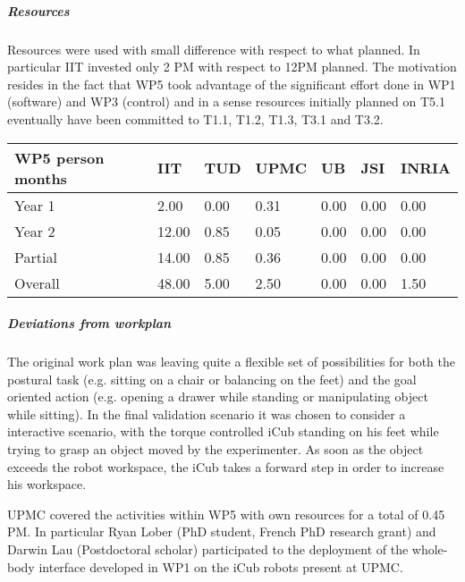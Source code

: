
\subparagraph{Resources}

Resources were used with small difference with respect to what planned. In particular IIT invested only 2 PM with respect to 12PM planned. The motivation resides in the fact that WP5 took advantage of the significant effort done in WP1 (software) and WP3 (control) and in a sense resources initially planned on T5.1 eventually have been committed to T1.1, T1.2, T1.3, T3.1 and T3.2.

\begin{center}
\begin{tabular}{|C{1.5cm}|C{1.5cm}|C{1.5cm}|C{2cm}|C{2cm}|C{2cm}|C{2cm}|}
\hline
\footnotesize \textbf{WP5 person months}& \footnotesize \textbf{IIT}&\footnotesize \textbf{TUD}&\footnotesize \textbf{UPMC}& \footnotesize \textbf{UB} &\footnotesize \textbf{JSI} & \footnotesize \textbf{INRIA} \\ \hline
\footnotesize Year 1 &  2.00 & 0.00 & 0.31 & 0.00 & 0.00 & 0.00     \\  \hline
\footnotesize Year 2 &  12.00 & 0.85 & 0.05 & 0.00 & 0.00 & 0.00     \\  \hline
\footnotesize Partial &  14.00 & 0.85 & 0.36 & 0.00 & 0.00 & 0.00 \\ \hline \hline
\footnotesize Overall &  48.00 & 5.00 & 2.50 & 0.00 & 0.00 & 1.50 \\ \hline
\end{tabular}
\end{center}

\subparagraph{Deviations from workplan} 
The original work plan was leaving quite a flexible set of possibilities for both the postural task (e.g. sitting on a chair or balancing on the feet) and the goal oriented action (e.g. opening a drawer while standing or manipulating object while sitting). In the final validation scenario it was chosen to consider a interactive scenario, with the torque controlled iCub standing on his feet while trying to grasp an object moved by the experimenter. As soon as the object exceeds the robot workspace, the iCub takes a forward step in order to increase his workspace. 

UPMC covered the activities within WP5 with own resources for a total of 0.45 PM. In particular Ryan Lober (PhD student, French PhD research grant) and Darwin Lau (Postdoctoral scholar) participated to the deployment of the whole-body interface developed in WP1 on the iCub robots present at UPMC.
